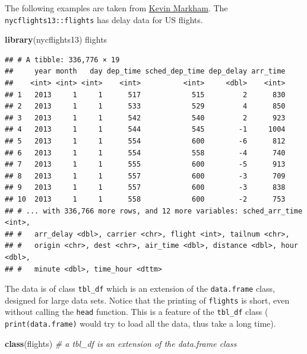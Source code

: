 \documentclass[]{book}
\newenvironment{Shaded}{\begin{snugshade}}{\end{snugshade}}
\newcommand{\KeywordTok}[1]{\textcolor[rgb]{0.13,0.29,0.53}{\textbf{{#1}}}}
\newcommand{\CommentTok}[1]{\textcolor[rgb]{0.56,0.35,0.01}{\textit{{#1}}}}
\newcommand{\NormalTok}[1]{{#1}}
\theoremstyle{definition}
\theoremstyle{definition}
\theoremstyle{remark}
\begin{document}
The following examples are taken from
\href{https://github.com/justmarkham/dplyr-tutorial/blob/master/dplyr-tutorial.Rmd}{Kevin
Markham}. The \texttt{nycflights13::flights} has delay data for US
flights.

\begin{Shaded}
\begin{Highlighting}[]
\KeywordTok{library}\NormalTok{(nycflights13)}
\NormalTok{flights}
\end{Highlighting}
\end{Shaded}

\begin{verbatim}
## # A tibble: 336,776 × 19
##     year month   day dep_time sched_dep_time dep_delay arr_time
##    <int> <int> <int>    <int>          <int>     <dbl>    <int>
## 1   2013     1     1      517            515         2      830
## 2   2013     1     1      533            529         4      850
## 3   2013     1     1      542            540         2      923
## 4   2013     1     1      544            545        -1     1004
## 5   2013     1     1      554            600        -6      812
## 6   2013     1     1      554            558        -4      740
## 7   2013     1     1      555            600        -5      913
## 8   2013     1     1      557            600        -3      709
## 9   2013     1     1      557            600        -3      838
## 10  2013     1     1      558            600        -2      753
## # ... with 336,766 more rows, and 12 more variables: sched_arr_time <int>,
## #   arr_delay <dbl>, carrier <chr>, flight <int>, tailnum <chr>,
## #   origin <chr>, dest <chr>, air_time <dbl>, distance <dbl>, hour <dbl>,
## #   minute <dbl>, time_hour <dttm>
\end{verbatim}

The data is of class \texttt{tbl\_df} which is an extension of the
\texttt{data.frame} class, designed for large data sets. Notice that the
printing of \texttt{flights} is short, even without calling the
\texttt{head} function. This is a feature of the \texttt{tbl\_df} class
( \texttt{print(data.frame)} would try to load all the data, thus take a
long time).

\begin{Shaded}
\begin{Highlighting}[]
\KeywordTok{class}\NormalTok{(flights) }\CommentTok{# a tbl_df is an extension of the data.frame class}
\end{Highlighting}
\end{Shaded}
\end{document}

